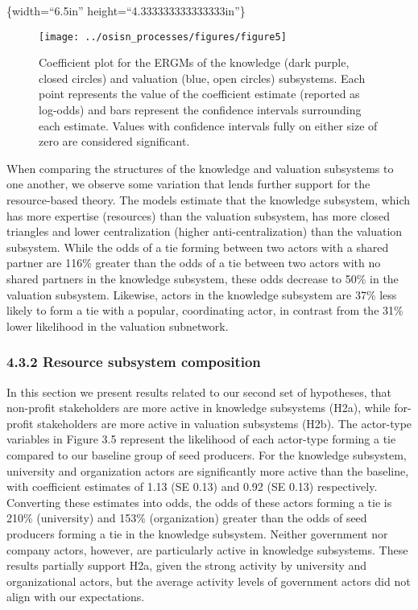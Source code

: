 \documentclass[twoside,12pt,final]{ucthesis-CA2012}
\begin{document}
\begin{ucmainmatter}
\{width=``6.5in'' height=``4.333333333333333in''\}
\begin{figure}

{\centering \texttt{[image: ../osisn\_processes/figures/figure5]} 

}

\caption{Coefficient plot for the ERGMs of the knowledge (dark purple, closed circles) and valuation (blue, open circles) subsystems. Each point represents the value of the coefficient estimate (reported as log-odds) and bars represent the confidence intervals surrounding each estimate. Values with confidence intervals fully on either size of zero are considered significant.}\label{fig:unnamed-chunk-21}
\end{figure}
When comparing the structures of the knowledge and valuation subsystems
to one another, we observe some variation that lends further support for
the resource-based theory. The models estimate that the knowledge
subsystem, which has more expertise (resources) than the valuation
subsystem, has more closed triangles and lower centralization (higher
anti-centralization) than the valuation subsystem. While the odds of a
tie forming between two actors with a shared partner are 116\% greater
than the odds of a tie between two actors with no shared partners in the
knowledge subsystem, these odds decrease to 50\% in the valuation
subsystem. Likewise, actors in the knowledge subsystem are 37\% less
likely to form a tie with a popular, coordinating actor, in contrast
from the 31\% lower likelihood in the valuation subnetwork.

\hypertarget{resource-subsystem-composition}{%
\subsubsection{4.3.2 Resource subsystem composition}\label{resource-subsystem-composition}}

In this section we present results related to our second set of
hypotheses, that non-profit stakeholders are more active in knowledge
subsystems (H2a), while for-profit stakeholders are more active in
valuation subsystems (H2b). The \textquotesingle actor-type\textquotesingle{} variables in Figure 3.5
represent the likelihood of each actor-type forming a tie compared to
our baseline group of seed producers. For the knowledge subsystem,
university and organization actors are significantly more active than
the baseline, with coefficient estimates of 1.13 (SE 0.13) and 0.92 (SE
0.13) respectively. Converting these estimates into odds, the odds of
these actors\textquotesingle{} forming a tie is 210\% (university) and 153\%
(organization) greater than the odds of seed producers forming a tie in
the knowledge subsystem. Neither government nor company actors, however,
are particularly active in knowledge subsystems. These results partially
support H2a, given the strong activity by university and organizational
actors, but the average activity levels of government actors did not
align with our expectations.


\end{ucmainmatter}
\end{document}

